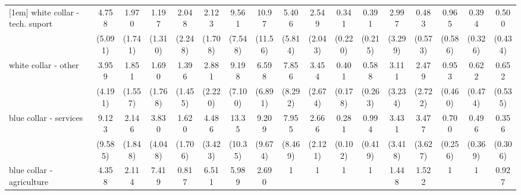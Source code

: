 {\begin{tabular}{l*{16}{c}}
[1em]
white collar - tech. suport&       4.758         &       1.970         &       1.197         &       2.048         &       2.123         &       9.561\sym{**} &       10.97\sym{*}  &       5.406         &       2.549         &       0.341         &       0.391         &       2.997         &       0.483         &       0.965         &       0.394         &       0.500         \\
                    &     (5.091)         &     (1.741)         &     (1.310)         &     (2.248)         &     (1.708)         &     (7.548)         &     (11.56)         &     (5.814)         &     (2.043)         &     (0.220)         &     (0.215)         &     (3.299)         &     (0.573)         &     (0.586)         &     (0.326)         &     (0.434)         \\
[1em]
white collar - other&       3.959         &       1.851         &       1.690         &       1.396         &       2.881         &       9.198\sym{**} &       6.598         &       7.856         &       3.454         &       0.401\sym{*}  &       0.588         &       3.111         &       2.479         &       0.953         &       0.622         &       0.652         \\
                    &     (4.191)         &     (1.557)         &     (1.768)         &     (1.455)         &     (2.220)         &     (7.100)         &     (6.891)         &     (8.292)         &     (2.674)         &     (0.178)         &     (0.263)         &     (3.234)         &     (2.722)         &     (0.460)         &     (0.474)         &     (0.535)         \\
[1em]
blue collar - services&       9.123\sym{*}  &       2.146         &       3.830         &       1.620         &       4.486\sym{*}  &       13.35\sym{***}&       9.209\sym{*}  &       7.955         &       2.666         &       0.281\sym{***}&       0.994         &       3.431         &       3.477         &       0.700         &       0.496         &       0.356         \\
                    &     (9.585)         &     (1.848)         &     (4.048)         &     (1.706)         &     (3.423)         &     (10.35)         &     (9.674)         &     (8.469)         &     (2.121)         &     (0.102)         &     (0.419)         &     (3.418)         &     (3.627)         &     (0.256)         &     (0.369)         &     (0.306)         \\
[1em]
blue collar - agriculture&       4.358         &       2.114         &       7.419         &       0.817         &       6.511         &       5.989         &       2.690         &           1         &           1         &           1         &           1         &       1.448         &       1.522         &           1         &           1         &       0.927         \\

\end{tabular}}
